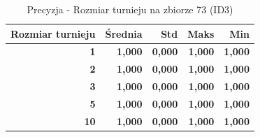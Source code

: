 \begin{table}[htbp]
\centering
\small
\setlength{\tabcolsep}{6pt}
\renewcommand{\arraystretch}{1.2}
\caption{Precyzja - Rozmiar turnieju na zbiorze 73 (ID3)}
\label{tab:ID3_tournament_size_73_precision}
\begin{tabular}{r|r|r|r|r}
\toprule
Rozmiar turnieju & Średnia & Std & Maks & Min \\
\hline
\textbf{1} & \textbf{1,000} & \textbf{0,000} & \textbf{1,000} & \textbf{1,000} \\
\textbf{2} & \textbf{1,000} & \textbf{0,000} & \textbf{1,000} & \textbf{1,000} \\
\textbf{3} & \textbf{1,000} & \textbf{0,000} & \textbf{1,000} & \textbf{1,000} \\
\textbf{5} & \textbf{1,000} & \textbf{0,000} & \textbf{1,000} & \textbf{1,000} \\
\textbf{10} & \textbf{1,000} & \textbf{0,000} & \textbf{1,000} & \textbf{1,000} \\
\bottomrule
\end{tabular}
\end{table}